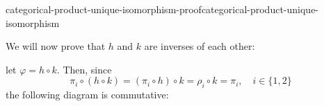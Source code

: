 \documentclass[preview]{standalone}
\begin{document}
\begin{snippetproof}{categorical-product-unique-isomorphism-proof}{categorical-product-unique-isomorphism}{}
\begin{minipage}{0.5\textwidth}
\begin{center}
        \end{center}
    \end{minipage}
    We will now prove that \(h\) and \(k\) are inverses of each other:
    \begin{center}
    \end{center}
    let \(\varphi = h \circ k\).
    Then, since
    \[
        \pi_i \circ (h \circ k) = (\pi_i \circ h) \circ k
        = \rho_i \circ k = \pi_i, \quad i\in \{1,2\}
    \]
    the following diagram is commutative:
    \begin{center}
\end{center}
\end{snippetproof}
\end{document}
